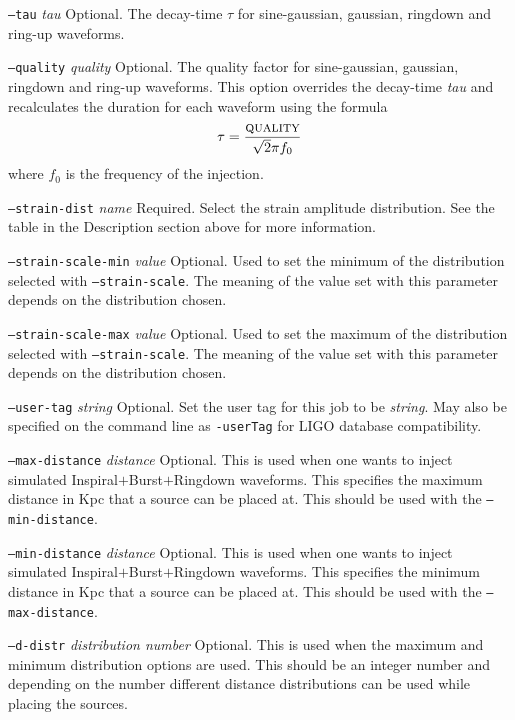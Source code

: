\documentclass[10pt]{article}
\newcommand{\option}[1]{\texttt{#1}}
\newcommand{\parm}[1]{\textit{#1}}
\newenvironment{entry}%
{\begin{list}{}{\renewcommand{\makelabel}[1]%
{\parbox[b]{\labelwidth}{\makebox[0pt][l]{\textbf{##1}}\\}}%
\setlength{\labelwidth}{1em}%
\setlength{\labelsep}{1em}%
\setlength{\leftmargin}{2em}%
\setlength{\topsep}{\medskipamount}%
\setlength{\itemsep}{\medskipamount}%
\setlength{\parsep}{\medskipamount}%
\setlength{\listparindent}{0pt}}}
{\end{list}}
\begin{document}
\begin{entry}
\begin{entry}
\item[\option{--tau} \parm{tau}]
Optional.  The decay-time $\tau$ for sine-gaussian,  gaussian,  ringdown
and ring-up waveforms.

\item[\option{--quality} \parm{quality}]
Optional.  The quality factor for sine-gaussian,  gaussian,  ringdown and
ring-up waveforms.    This option overrides the decay-time \parm{tau} and
recalculates the duration for each waveform using the formula
$$ 
\tau = \frac{\textsc{quality} }{ \sqrt{2} \pi f_0 }
$$
where $f_0$ is the frequency of the injection.

\item[\option{--strain-dist} \parm{name}]
Required.  Select the strain amplitude distribution.  See the table in the
Description section above for more information.

\item[\option{--strain-scale-min} \parm{value}]
Optional.  Used to set the minimum of the distribution selected with
\option{--strain-scale}.  The meaning of the value set with this parameter
depends on the distribution chosen.

\item[\option{--strain-scale-max} \parm{value}]
Optional.  Used to set the maximum of the distribution selected with
\option{--strain-scale}.  The meaning of the value set with this parameter
depends on the distribution chosen.

\item[\option{--user-tag} \parm{string}]
Optional. Set the user tag for this job to be \parm{string}. May also be
specified on the command line as \option{-userTag} for LIGO database
compatibility.

\item[\option{--max-distance} \parm{distance}]
Optional.  This is used when one wants to inject simulated Inspiral$+$Burst$+$Ringdown 
waveforms.  This specifies the maximum distance in Kpc that a source can be placed at.
This should be used with the \option{--min-distance}.

\item[\option{--min-distance} \parm{distance}]
Optional.  This is used when one wants to inject simulated Inspiral$+$Burst$+$Ringdown 
waveforms.  This specifies the minimum distance in Kpc that a source can be placed at.
This should be used with the \option{--max-distance}.

\item[\option{--d-distr} \parm{distribution number}] 
Optional.  This is used when the maximum and minimum distribution options are used.
 This should be an integer number and depending on the number different distance
distributions can be used while placing the sources.  


\end{entry}
\end{entry}
\end{document}

